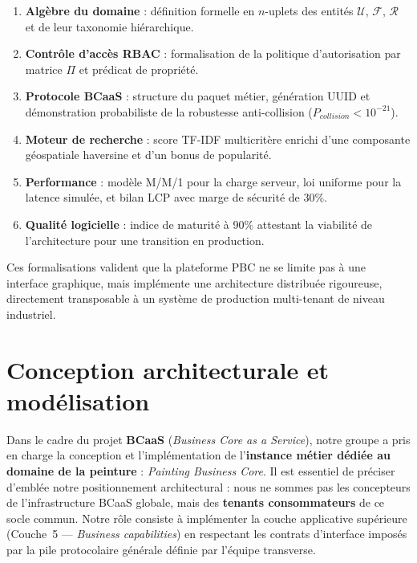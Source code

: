 \documentclass[12pt,a4paper]{report}
\begin{document}
\begin{enumerate}
  \item \textbf{Algèbre du domaine} : définition formelle en $n$-uplets des entités $\mathcal{U}$, $\mathcal{F}$, $\mathcal{R}$
    et de leur taxonomie hiérarchique.
  \item \textbf{Contrôle d'accès RBAC} : formalisation de la politique d'autorisation par
    matrice $\Pi$ et prédicat de propriété.
  \item \textbf{Protocole BCaaS} : structure du paquet métier, génération UUID et
    démonstration probabiliste de la robustesse anti-collision ($P_{collision} < 10^{-21}$).
  \item \textbf{Moteur de recherche} : score TF-IDF multicritère enrichi d'une composante
    géospatiale haversine et d'un bonus de popularité.
  \item \textbf{Performance} : modèle M/M/1 pour la charge serveur, loi uniforme pour
    la latence simulée, et bilan LCP avec marge de sécurité de 30\%.
  \item \textbf{Qualité logicielle} : indice de maturité à 90\% attestant la viabilité de
    l'architecture pour une transition en production.
\end{enumerate}

Ces formalisations valident que la plateforme PBC ne se limite pas à une interface
graphique, mais implémente une architecture distribuée rigoureuse, directement
transposable à un système de production multi-tenant de niveau industriel.
\newpage

\section{Conception architecturale et modélisation }

Dans le cadre du projet \textbf{BCaaS} (\textit{Business Core as a Service}), notre groupe a pris en charge la conception et l'implémentation de l'\textbf{instance métier dédiée au domaine de la peinture} : \textit{Painting Business Core}. Il est essentiel de préciser d'emblée notre positionnement architectural : nous ne sommes pas les concepteurs de l'infrastructure BCaaS globale, mais des \textbf{tenants consommateurs} de ce socle commun. Notre rôle consiste à implémenter la couche applicative supérieure (Couche~5 --- \textit{Business capabilities}) en respectant les contrats d'interface imposés par la pile protocolaire générale définie par l'équipe transverse.
\end{document}
